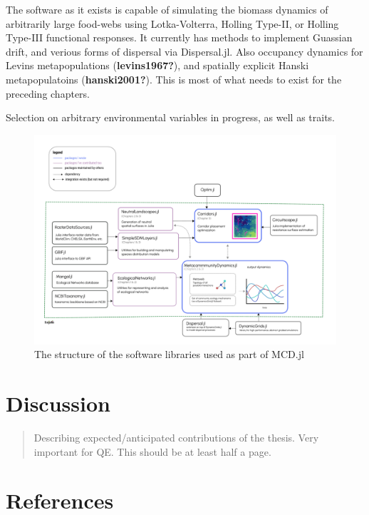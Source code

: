 \documentclass[11pt]{article}
\makeatletter
\def\maxwidth{\ifdim\Gin@nat@width>\linewidth\linewidth
\else\Gin@nat@width\fi}
\let\Oldincludegraphics\includegraphics
\renewcommand{\includegraphics}[1]{\Oldincludegraphics[width=\maxwidth]{#1}}
\makeatother
\begin{document}
The software as it exists is capable of simulating the biomass dynamics
of arbitrarily large food-webs using Lotka-Volterra, Holling Type-II, or
Holling Type-III functional responses. It currently has methods to
implement Guassian drift, and verious forms of dispersal via
Dispersal.jl. Also occupancy dynamics for Levins metapopulations
(\textbf{levins1967?}), and spatially explicit Hanski metapopulatoins
(\textbf{hanski2001?}). This is most of what needs to exist for the
preceding chapters.

Selection on arbitrary environmental variables in progress, as well as
traits.

\begin{figure}
\hypertarget{fig:software}{%
\centering
\includegraphics{./figures/ch4.png}
\caption{The structure of the software libraries used as part of
MCD.jl}\label{fig:software}
}
\end{figure}

\hypertarget{discussion-1}{%
\section{Discussion}\label{discussion-1}}

\begin{quote}
Describing expected/anticipated contributions of the thesis. Very
important for QE. This should be at least half a page.
\end{quote}

\hypertarget{references}{%
\section*{References}\label{references}}
\end{document}
